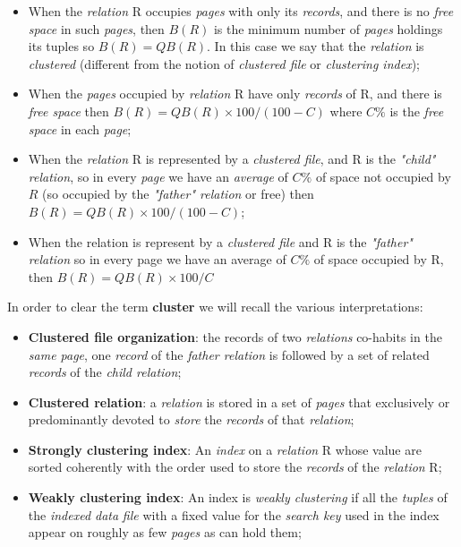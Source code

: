 \documentclass{article}
\begin{document}
\begin{itemize}
\item When the \emph{relation} R occupies \emph{pages} with only its \emph{records}, and there is no \emph{free space} in such \emph{pages}, then $B(R)$ is the minimum number of \emph{pages} holdings its tuples so $B(R)=QB(R)$. In this case we say that the \emph{relation} is \emph{clustered} (different from the notion of \emph{clustered file} or \emph{clustering index});
\item When the \emph{pages} occupied by \emph{relation} R have only \emph{records} of R, and there is \emph{free space} then $B(R)=QB(R) \times 100 /(100-C)$ where $C\%$ is the \emph{free space} in each \emph{page};
\item When the \emph{relation} R is represented by a \emph{clustered file}, and R is the \emph{"child" relation}, so in every \emph{page} we have an \emph{average} of $C\%$ of space not occupied by $R$ (so occupied by the \emph{"father" relation} or free) then $B(R)=QB(R) \times 100 /(100-C)$;
\item When the relation is represent by a \emph{clustered file} and R is the \emph{"father" relation} so in every page we have an average of $C\%$ of space occupied by R, then $B(R)=QB(R) \times 100 / C$
\end{itemize}
In order to clear the term \textbf{cluster} we will recall the various interpretations:
\begin{itemize}
\item \textbf{Clustered file organization}: the records of two \emph{relations} co-habits in the \emph{same page}, one \emph{record} of the \emph{father relation} is followed by a set of related \emph{records} of the\emph{ child relation};
\item \textbf{Clustered relation}: a \emph{relation} is stored in a set of \emph{pages} that exclusively or predominantly devoted to \emph{store} the \emph{records} of that \emph{relation};
\item \textbf{Strongly clustering index}: An \emph{index} on a \emph{relation} R whose value are sorted coherently with the order used to store the \emph{records} of the \emph{relation} R;
\item \textbf{Weakly clustering index}: An index is \emph{weakly clustering} if all the \emph{tuples} of the \emph{indexed data} \emph{file} with a fixed value for the \emph{search key} used in the index appear on roughly as few \emph{pages} as can hold them;
\end{itemize}
\clearpage
\end{document}
